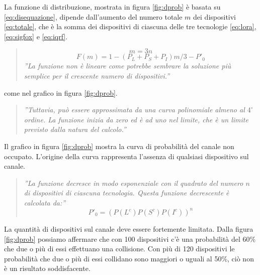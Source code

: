 \documentclass[a4paper]{report} %
\begin{document}
La funzione di distribuzione, mostrata in figura \ref{fig:dprob} è basata su \ref{eq:disequazione}, dipende dall'aumento del numero totale $m$ dei dispositivi \ref{eq:totale}, che è la somma dei dispositivi di ciascuna delle tre tecnologie \ref{eq:lora}, \ref{eq:sigfox} e \ref{eq:iqrf}.
\begin{quote}
	\begin{equation}
	\label{eq:totale}
	m = 3n 
	\end{equation}
	\begin{equation}
	\label{eq:distribuzione}
	F(m) = 1 - (P_L+P_S+P_I)m/3 - P'_0 
	\end{equation}
	\textit{''La funzione non è lineare come potrebbe sembrare la soluzione più semplice per il crescente numero di dispositivi.''}
\end{quote}
come nel grafico in figura \ref{fig:dprob}. 
\begin{quote}
	\textit{''Tuttavia, può essere approssimata da una curva polinomiale almeno al $4^{\circ}$ ordine. La funzione inizia da zero ed è ad uno nel limite, che è un limite previsto dalla natura del calcolo.''} 
\end{quote}
Il grafico in figura \ref{fig:dprob} mostra la curva di probabilità del canale non occupato. L'origine della curva rappresenta l'assenza di qualsiasi dispositivo sul canale. 
\begin{quote}
	\textit{''La funzione decresce in modo esponenziale con il quadrato del numero $n$ di dispositivi di ciascuna tecnologia. Questa funzione decrescente è calcolata da:''}
	\begin{equation}
	P'_0 = (P(L^c)P(S^c)P(I^c))^n 
	\end{equation}
\end{quote}
La quantità di dispositivi sul canale deve essere fortemente limitata. Dalla figura \ref{fig:dprob} possiamo affermare che con 100 dispositivi c'è una probabilità del 60\% che due o più di essi effettuano una collisione. Con più di 120 dispositivi le probabilità che due o più di essi collidano sono maggiori o uguali al 50\%, ciò non è un risultato soddisfacente.
\end{document}

